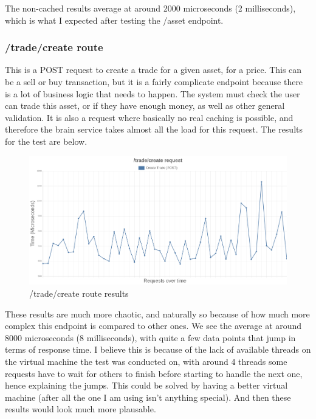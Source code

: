 \documentclass[titlepage]{article}
\begin{document}
The non-cached results average at around 2000 microseconds (2 milliseconds), which is what I expected after testing the /asset endpoint.

\pagebreak
\subsubsection{/trade/create route}
This is a POST request to create a trade for a given asset, for a price. This can be a sell or buy transaction, but it is a fairly complicate endpoint because there is a lot of business logic that needs to happen. The system must check the user can trade this asset, or if they have enough money, as well as other general validation. It is also a request where basically no real caching is possible, and therefore the brain service takes almost all the load for this request. The results for the test are below.

\begin{figure}[h!]
  \caption{/trade/create route results}
\hspace*{-3cm}
\includegraphics[width=1.5\textwidth]{../results/create-trade.png}
\end{figure}

These results are much more chaotic, and naturally so because of how much more complex this endpoint is compared to other ones. We see the average at around 8000 microseconds (8 milliseconds), with quite a few data points that jump in terms of response time. I believe this is because of the lack of available threads on the virtual machine the test was conducted on, with around 4 threads some requests have to wait for others to finish before starting to handle the next one, hence explaining the jumps. This could be solved by having a better virtual machine (after all the one I am using isn't anything special). And then these results would look much more plausable. \\
\end{document}
